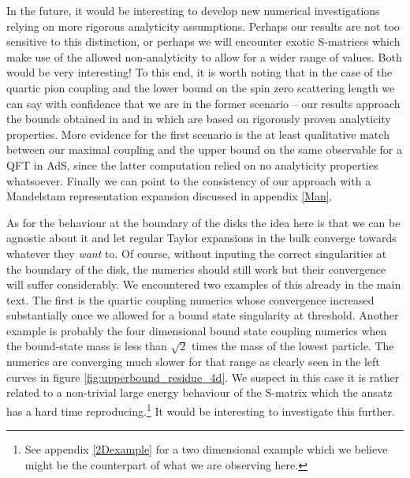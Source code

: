 \documentclass[12pt]{article}
\newcommand{\<}{{\langle}}
\renewcommand{\>}{{\rangle}}
\begin{document}
In the future, it would be interesting to develop new numerical investigations relying on more rigorous analyticity assumptions. Perhaps our results are not too sensitive to this distinction, or perhaps we will encounter exotic S-matrices which make use of the allowed non-analyticity to allow for a wider range of values.  Both would be very interesting!  To this end, it is worth noting that in the case of the quartic pion coupling and the lower bound on the spin zero scattering length we can say with confidence that we are in the former scenario -- our results approach the bounds obtained in \cite{Lopez:1976zs, Auberson:1979ye} and in \cite{Caprini:1980un} which are based on rigorously proven analyticity properties. More evidence for the first scenario is the at least qualitative match between our maximal coupling and the upper bound on the same observable for a QFT in AdS, since the latter computation relied on no analyticity properties whatsoever. Finally we can point to the consistency of our approach with a Mandelstam representation expansion discussed in appendix \ref{Man}.

As for the behaviour at the boundary of the disks the idea here is that we can be agnostic about it and let regular Taylor expansions in the bulk converge towards whatever they \textit{want} to. Of course, without inputing the correct singularities at the boundary of the disk, the numerics should still work but their convergence will suffer considerably. We encountered two examples of this already in the main text. The first is the quartic coupling numerics whose convergence increased substantially once we allowed for a bound state singularity at threshold. Another example is probably the four dimensional bound state coupling numerics when the bound-state mass is less than $\sqrt{2}$ times the mass of the lowest particle. The numerics are converging much slower for that range as clearly seen in the left curves in figure \ref{fig:upperbound_residue_4d}. We suspect in this case it is rather related to a non-trivial large energy behaviour of the S-matrix which the ansatz has a hard time reproducing.\footnote{See appendix \ref{2Dexample} for a two dimensional example which we believe might be the counterpart of what we are observing here.} It would be interesting to investigate this further. 
\end{document}

